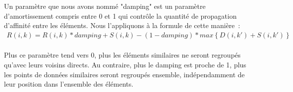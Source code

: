 \begin{appendix}
    \hspace*{13px} Un paramètre que nous avons nommé "damping" est un paramètre d'amortissement compris entre 0 et 1 qui contrôle la quantité de propagation d'affinité entre les éléments. Nous l'appliquons à la formule de cette manière :\\ 
    \begin{equation}
        \begin{aligned}
            R\left ( i,k \right ) = R\left ( i,k \right ) * damping + S\left ( i,k \right ) - (1 - damping) * max\left \{ D\left ( i,k' \right ) + S\left ( i,k' \right ) \right \}
        \end{aligned}
    \end{equation}\\
    Plus ce paramètre tend vers 0, plus les éléments similaires ne seront regroupés qu'avec leurs voisins directs. Au contraire, plus le damping est proche de 1, plus les points de données similaires seront regroupés ensemble, indépendamment de leur position dans l'ensemble des éléments.\\
    

\end{appendix}
